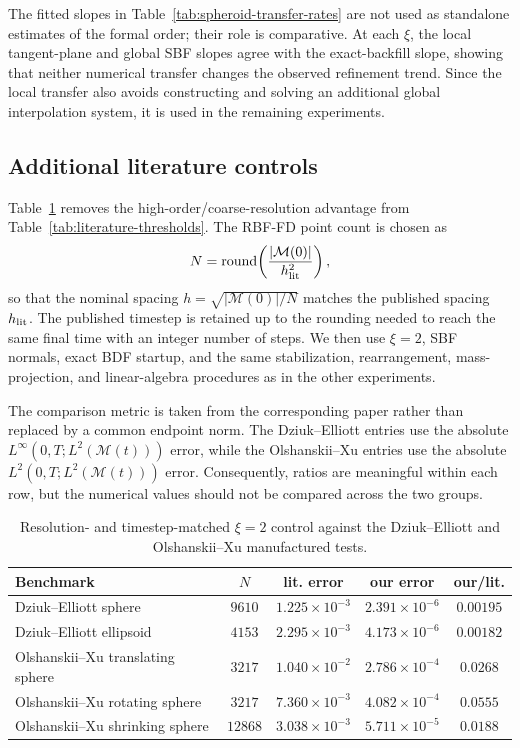 \documentclass[a4paper,fleqn]{cas-sc}
\begin{document}
The fitted slopes in Table~\ref{tab:spheroid-transfer-rates} are not used as
standalone estimates of the formal order; their role is comparative.  At each
\(\xi\), the local tangent-plane and global SBF slopes agree with the
exact-backfill slope, showing that neither numerical transfer changes the
observed refinement trend.  Since the local transfer also avoids constructing
and solving an additional global interpolation system, it is used in the
remaining experiments.

\subsection{Additional literature controls}
\label{app:literature-controls}

Table~\ref{tab:literature-matched-xi2} removes the high-order/coarse-resolution
advantage from Table~\ref{tab:literature-thresholds}.  The RBF-FD point count
is chosen as
\[
  N=\operatorname{round}\!\left(
    \frac{|\mathcal M(0)|}{h_{\rm lit}^2}
  \right),
\]
so that the nominal spacing
\(h=\sqrt{|\mathcal M(0)|/N}\) matches the published spacing
\(h_{\rm lit}\).  The published timestep is retained up to the rounding needed
to reach the same final time with an integer number of steps.  We then use
\(\xi=2\), SBF normals, exact BDF startup, and the same stabilization,
rearrangement, mass-projection, and linear-algebra procedures as in the other
experiments.

The comparison metric is taken from the corresponding paper rather than
replaced by a common endpoint norm.  The Dziuk--Elliott entries use the absolute
\(L^\infty(0,T;L^2(\mathcal M(t)))\) error, while the Olshanskii--Xu entries use
the absolute \(L^2(0,T;L^2(\mathcal M(t)))\) error.  Consequently, ratios are
meaningful within each row, but the numerical values should not be compared
across the two groups.

\begin{table}[!htbp]
\centering
\caption{Resolution- and timestep-matched \(\xi=2\) control against the
Dziuk--Elliott \cite{DziukElliott2007EvolvingSurfaces} and Olshanskii--Xu
\cite{OlshanskiiXu2017TraceFEM} manufactured tests.}
\scriptsize
\setlength{\tabcolsep}{3pt}
\label{tab:literature-matched-xi2}
\begin{tabular}{l c c c c}
\toprule
Benchmark & \(N\) & lit. error & our error & our/lit. \\
\midrule
Dziuk--Elliott sphere & \(9610\) &
\(1.225{\times}10^{-3}\) & \(2.391{\times}10^{-6}\) & \(0.00195\) \\
Dziuk--Elliott ellipsoid & \(4153\) &
\(2.295{\times}10^{-3}\) & \(4.173{\times}10^{-6}\) & \(0.00182\) \\
Olshanskii--Xu translating sphere & \(3217\) &
\(1.040{\times}10^{-2}\) & \(2.786{\times}10^{-4}\) & \(0.0268\) \\
Olshanskii--Xu rotating sphere & \(3217\) &
\(7.360{\times}10^{-3}\) & \(4.082{\times}10^{-4}\) & \(0.0555\) \\
Olshanskii--Xu shrinking sphere & \(12868\) &
\(3.038{\times}10^{-3}\) & \(5.711{\times}10^{-5}\) & \(0.0188\) \\
\bottomrule
\end{tabular}
\end{table}
\end{document}
